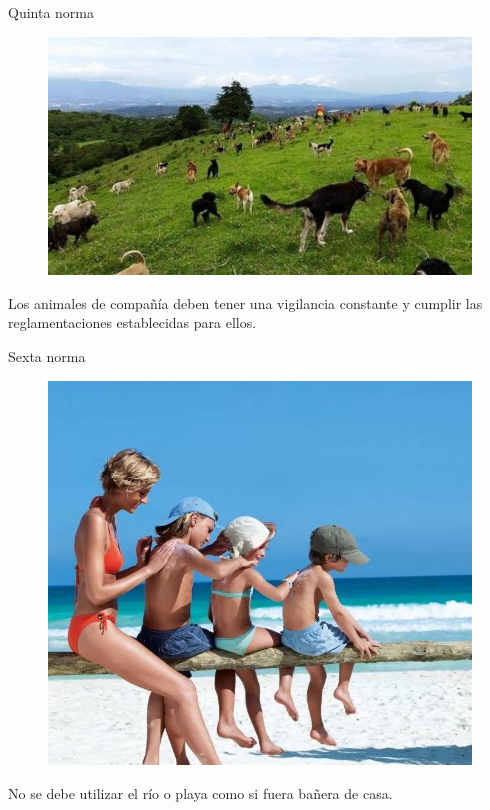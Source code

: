 \documentclass{beamer}
\begin{document}
\begin{frame}{Quinta norma}
\begin{figure}
\includegraphics[scale=.5]{Images/NORMA5.jpg} 
\end{figure}
Los animales de compañía deben tener una vigilancia constante y cumplir las reglamentaciones establecidas para ellos.
\end{frame}
\begin{frame}{Sexta norma}
\begin{figure}
\includegraphics[scale=.25]{Images/NORMA6.png} 
\end{figure}
No se debe utilizar el río o playa como si fuera bañera de casa.
\end{frame}
\end{document}
